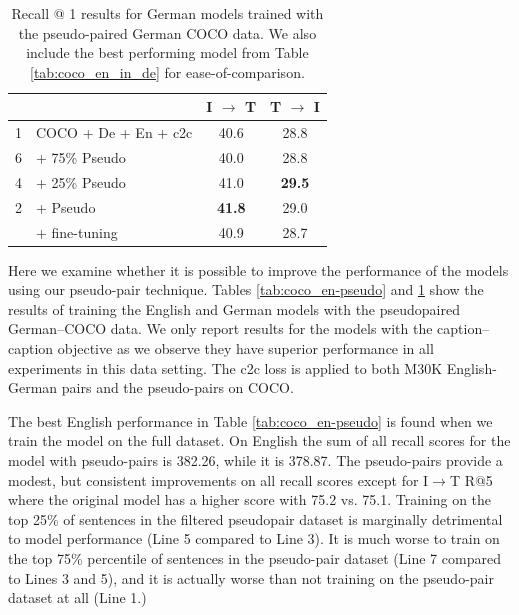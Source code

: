 \begin{table}[]
    \centering
    \renewcommand{\arraystretch}{1.0}
    \begin{tabular}{rlcc}
        \toprule
        & & I $\rightarrow$ T & T $\rightarrow$ I \\
        \midrule
        1 & COCO + De + En + c2c & 40.6 & 28.8 \\
        \hdashline
        6 & \; + 75\% Pseudo & 40.0 & 28.8 \\
        4 & \; + 25\% Pseudo & 41.0 & \textbf{29.5} \\
        2 & \; + Pseudo & \textbf{41.8} & 29.0 \\
        \hdashline
        2 & \; \; + fine-tuning & 40.9 & 28.7 \\


        \midrule
    \end{tabular}
    \caption{Recall @ 1 results for German models trained with the pseudo-paired German COCO data. We also include the best performing model from Table \ref{tab:coco_en_in_de} for ease-of-comparison.}\label{tab:coco_de-pseudo}
\end{table}

Here we examine whether it is possible to improve the performance of the models using our
pseudo-pair technique. Tables \ref{tab:coco_en-pseudo} and \ref{tab:coco_de-pseudo} 
show the results of training the English and German models with the pseudopaired 
German--COCO data. We only report results for the models with the caption--caption objective as we observe they have superior performance in all experiments in this data setting.
The c2c loss is applied to both M30K English-German pairs and the pseudo-pairs on COCO.

The best English performance in Table \ref{tab:coco_en-pseudo} is found when we train the model on the full dataset.
On English the sum of all recall scores for the model with pseudo-pairs is 382.26, while 
it is 378.87. The pseudo-pairs provide a modest, but consistent 
improvements on all recall scores except for I$\rightarrow$T R@5 where 
the original model has a higher score with 75.2 vs. 75.1. Training on the top 25\% of sentences in the filtered pseudopair dataset is marginally detrimental to model performance (Line 5 compared to Line 3). It is much worse to train on the top 75\% percentile of sentences in the pseudo-pair dataset (Line 7 compared to Lines 3 and 5), and it is actually worse than not training on the pseudo-pair dataset at all (Line 1.)

